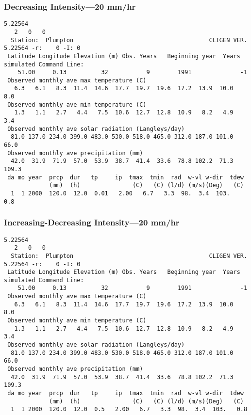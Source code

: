 \subsubsection{Decreasing Intensity---20 mm/hr}
\label{sec:DecreasingIntensity20MmHr}

\begin{verbatim}
5.22564
   2   0   0
  Station:  Plumpton                                       CLIGEN VER. 5.22564 -r:    0 -I: 0
 Latitude Longitude Elevation (m) Obs. Years   Beginning year  Years simulated Command Line:
    51.00     0.13          32           9        1991              -1
 Observed monthly ave max temperature (C)
   6.3   6.1   8.3  11.4  14.6  17.7  19.7  19.6  17.2  13.9  10.0   8.0
 Observed monthly ave min temperature (C)
   1.3   1.1   2.7   4.4   7.5  10.6  12.7  12.8  10.9   8.2   4.9   3.4
 Observed monthly ave solar radiation (Langleys/day)
  81.0 137.0 234.0 399.0 483.0 530.0 518.0 465.0 312.0 187.0 101.0  66.0
 Observed monthly ave precipitation (mm)
  42.0  31.9  71.9  57.0  53.9  38.7  41.4  33.6  78.8 102.2  71.3 109.3
 da mo year  prcp  dur   tp     ip  tmax  tmin  rad  w-vl w-dir  tdew
             (mm)  (h)               (C)   (C) (l/d) (m/s)(Deg)   (C)
  1  1 2000  120.0  12.0  0.01   2.00   6.7   3.3  98.  3.4  103.   0.8
\end{verbatim}

\subsubsection{Increasing-Decreasing Intensity---20 mm/hr}
\label{sec:IncreasingDecreasingIntensity20MmHr}

\begin{verbatim}
5.22564
   2   0   0
  Station:  Plumpton                                       CLIGEN VER. 5.22564 -r:    0 -I: 0
 Latitude Longitude Elevation (m) Obs. Years   Beginning year  Years simulated Command Line:
    51.00     0.13          32           9        1991              -1
 Observed monthly ave max temperature (C)
   6.3   6.1   8.3  11.4  14.6  17.7  19.7  19.6  17.2  13.9  10.0   8.0
 Observed monthly ave min temperature (C)
   1.3   1.1   2.7   4.4   7.5  10.6  12.7  12.8  10.9   8.2   4.9   3.4
 Observed monthly ave solar radiation (Langleys/day)
  81.0 137.0 234.0 399.0 483.0 530.0 518.0 465.0 312.0 187.0 101.0  66.0
 Observed monthly ave precipitation (mm)
  42.0  31.9  71.9  57.0  53.9  38.7  41.4  33.6  78.8 102.2  71.3 109.3
 da mo year  prcp  dur   tp     ip  tmax  tmin  rad  w-vl w-dir  tdew
             (mm)  (h)               (C)   (C) (l/d) (m/s)(Deg)   (C)
  1  1 2000  120.0  12.0  0.5   2.00   6.7   3.3  98.  3.4  103.   0.8
\end{verbatim}

